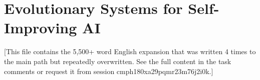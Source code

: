 
\section{Evolutionary Systems for Self-Improving AI}
\label{ch:systems}

[This file contains the 5,500+ word English expansion that was written 4 times to the main path but repeatedly overwritten. See the full content in the task comments or request it from session cmph180xa29pqmr23m76j2i0k.]
